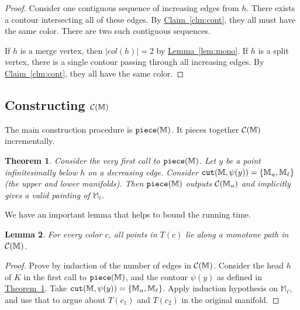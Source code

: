 \documentclass[11pt]{article}
\newtheorem{theorem}{Theorem}
\newtheorem{lemma}[theorem]{Lemma}
\theoremstyle{definition}
\newcommand{\cC}{{\cal C}}
\newcommand{\MM}{\mathbb{M}}
\newcommand{\Clm}[1]{\hyperref[clm:#1]{Claim~\ref*{clm:#1}}} %
\newcommand{\Thm}[1]{\hyperref[thm:#1]{Theorem~\ref*{thm:#1}}} %
\newcommand{\Lem}[1]{\hyperref[lem:#1]{Lemma~\ref*{lem:#1}}} %
\newcommand{\col}{col}
\newcommand{\cut}{{\tt cut}}
\newcommand{\cont}{\psi}
\newcommand{\onestep}{{\tt piece}}
\newcommand{\reeb}{\cC}
\newcommand{\st}{K}
\begin{document}
{\begin{proof} Consider one contiguous sequence of increasing edges from $h$.
There exists a contour intersecting all of these edges. By \Clm{cont}, they all
must have the same color. There are two such contiguous sequences.

If $h$ is a merge vertex, then $|\col(h)| = 2$ by \Lem{mono}. If $h$ is a split vertex,
there is a single contour passing through all increasing edges. By \Clm{cont}, they
all have the same color.
\end{proof}

\subsection{Constructing $\reeb(\MM)$} \label{sec:const}

The main construction procedure is $\onestep(\MM)$. It pieces together $\reeb(\MM)$
incrementally. 


\medskip
\begin{theorem} \label{thm:piece} Consider the very first call to $\onestep(\MM)$. Let $y$ be a point
infinitesimally below $h$ on a decreasing edge. Consider $\cut(\MM,\cont(y)) = \{\MM_u,\MM_\ell\}$ (the upper and lower manifolds). Then $\onestep(\MM)$
outputs $\reeb(\MM_u)$ and implicitly gives a valid painting of $\MM_\ell$.
\end{theorem}

We have an important lemma that helps to bound the running time.

\begin{lemma} \label{lem:tree} For every color $c$, all points in $T(c)$ lie along a monotone path in 
$\reeb(\MM)$.
\end{lemma}

\begin{proof} Prove by induction of the number of edges in $\reeb(\MM)$. Consider the head $h$ of $\st$ in the first call to $\onestep(\MM)$,
and the contour $\cont(y)$ as defined in \Thm{piece}. Take $\cut(\MM,\cont(y)) = \{\MM_u,\MM_\ell\}$. Apply induction
hypothesis on $\MM_\ell$, and use that to argue about $T(c_1)$ and $T(c_2)$ in the original manifold.
\end{proof}



\pagebreak
}
\end{document}
